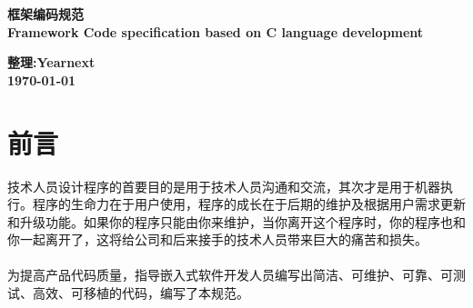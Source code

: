 \documentclass[UTF8,a4paper,12pt]{article}
\begin{document}
	\begin{center}
		\textbf{框架编码规范}\\
		\textbf{Framework Code specification based on C language development}
		\newline
		\newline
		\newline
		\newline
		\newline
		\newline
		\newline
		\newline
		\newline
		\newline
		\newline
		\newline
		\newline
		\newline
		\newline
		\newline
		\newline
		\newline
		\newline
		\newline
		\newline
		\newline
		\newline
		\newline
		\newline
	\end{center}

	\begin{center}
		\textbf{整理:Yearnext}
		\\
		\textbf{\today}
	\end{center}
	\newpage
	
	\tableofcontents
	\newpage
	
	\section{前言}
	技术人员设计程序的首要目的是用于技术人员沟通和交流，其次才是用于机器执行。程序的生命力在于用户使用，程序的成长在于后期的维护及根据用户需求更新和升级功能。如果你的程序只能由你来维护，当你离开这个程序时，你的程序也和你一起离开了，这将给公司和后来接手的技术人员带来巨大的痛苦和损失。\\
	\\
	为提高产品代码质量，指导嵌入式软件开发人员编写出简洁、可维护、可靠、可测试、高效、可移植的代码，编写了本规范。\\
\end{document}
